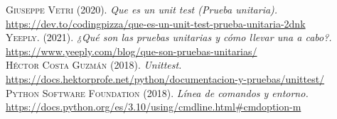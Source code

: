 \documentclass[conference]{IEEEtran}
\begin{document}
\begin{thebibliography}{}


 \textsc{Giuseppe Vetri} (2020). \textit{Que es un unit test (Prueba unitaria).} \url{https://dev.to/codingpizza/que-es-un-unit-test-prueba-unitaria-2dnk}\\

 \textsc{Yeeply.} (2021). \textit{¿Qué son las pruebas unitarias y cómo llevar una a cabo?.} \url{https://www.yeeply.com/blog/que-son-pruebas-unitarias/} \\

 \textsc{Héctor Costa Guzmán} (2018). \textit{Unittest.} \url{https://docs.hektorprofe.net/python/documentacion-y-pruebas/unittest/} \\

 \textsc{Python Software Foundation} (2018). \textit{Línea de comandos y entorno.} \url{https://docs.python.org/es/3.10/using/cmdline.html#cmdoption-m} \\



\end{thebibliography}
\end{document}
